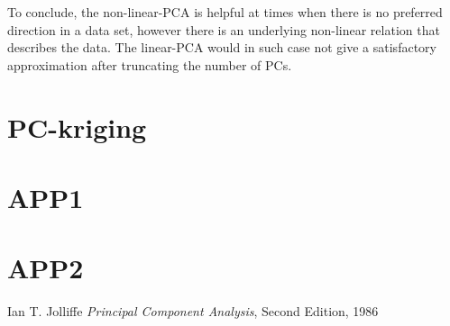\documentclass[10pt,twocolumn]{article}
\begin{document}
To conclude, the non-linear-PCA is helpful at times when there is no preferred direction in a data set, however there is an underlying non-linear relation that describes the data. The linear-PCA would in such case not give a satisfactory approximation after truncating the number of PCs. 


\section{PC-kriging}












\appendix

\section{APP1} \label{app:A}

\section{APP2} \label{app:B}

\thebibliography{}

 Ian T. Jolliffe \textit{Principal Component Analysis}, Second Edition, 1986

 \label{bib:pope}
\end{document}
